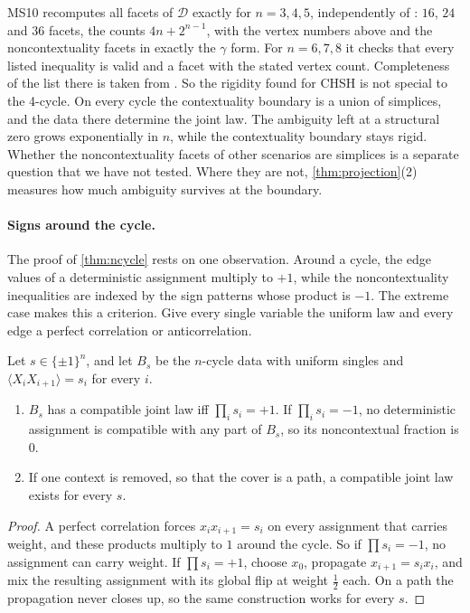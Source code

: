 \documentclass[11pt]{article}
\theoremstyle{definition}\newtheorem{definition}[theorem]{Definition}\newtheorem{remark}[theorem]{Remark}\newtheorem{example}[theorem]{Example}\newtheorem{problem}[theorem]{Open problem}\crefname{problem}{Problem}{Problems}
\begin{document}
MS10 recomputes all facets of $\mathcal D$ exactly for $n=3,4,5$, independently of \cite{AraujoEtAl2013}: $16$, $24$ and $36$ facets, the counts $4n+2^{n-1}$, with the vertex numbers above and the noncontextuality facets in exactly the $\gamma$ form. For $n=6,7,8$ it checks that every listed inequality is valid and a facet with the stated vertex count. Completeness of the list there is taken from \cite{AraujoEtAl2013}. So the rigidity found for CHSH is not special to the 4-cycle. On every cycle the contextuality boundary is a union of simplices, and the data there determine the joint law. The ambiguity left at a structural zero grows exponentially in $n$, while the contextuality boundary stays rigid. Whether the noncontextuality facets of other scenarios are simplices is a separate question that we have not tested. Where they are not, \cref{thm:projection}(2) measures how much ambiguity survives at the boundary.

\paragraph{Signs around the cycle.} The proof of \cref{thm:ncycle} rests on one observation. Around a cycle, the edge values of a deterministic assignment multiply to $+1$, while the noncontextuality inequalities are indexed by the sign patterns whose product is $-1$. The extreme case makes this a criterion. Give every single variable the uniform law and every edge a perfect correlation or anticorrelation.

\begin{proposition}\label{prop:twist}
Let $s\in\{\pm1\}^n$, and let $B_s$ be the $n$-cycle data with uniform singles and $\langle X_iX_{i+1}\rangle=s_i$ for every $i$.
\begin{enumerate}
\item[(1)] $B_s$ has a compatible joint law iff $\prod_is_i=+1$. If $\prod_is_i=-1$, no deterministic assignment is compatible with any part of $B_s$, so its noncontextual fraction is $0$.
\item[(2)] If one context is removed, so that the cover is a path, a compatible joint law exists for every $s$.
\end{enumerate}
\end{proposition}

\begin{proof}
A perfect correlation forces $x_ix_{i+1}=s_i$ on every assignment that carries weight, and these products multiply to $1$ around the cycle. So if $\prod s_i=-1$, no assignment can carry weight. If $\prod s_i=+1$, choose $x_0$, propagate $x_{i+1}=s_ix_i$, and mix the resulting assignment with its global flip at weight $\tfrac12$ each. On a path the propagation never closes up, so the same construction works for every $s$.
\end{proof}
\end{document}
